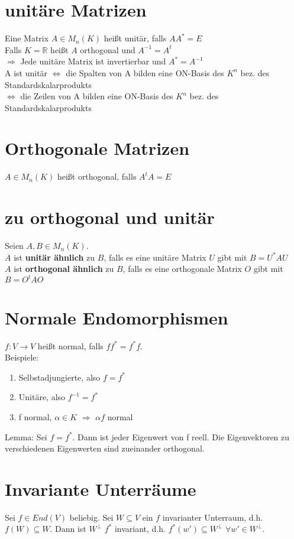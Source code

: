 \section{unitäre Matrizen}
Eine Matrix $A \in M_n(K)$ heißt unitär, falls $AA^* = E$\\
Falls $K = \mathbb{R}$ heißt $A$ orthogonal und $A^{-1} = A^t$\\
$\Rightarrow$ Jede unitäre Matrix ist invertierbar und $A^* = A^{-1}$\\
A ist unitär $\Leftrightarrow$ die Spalten von A bilden eine ON-Basis des $K^n$ bez. des Standardskalarprodukts\\
\hspace*{18mm} $\Leftrightarrow$ die Zeilen von A bilden eine ON-Basis des $K^n$ bez. des Standardskalarprodukts\\

\section{Orthogonale Matrizen}
$A \in M_n(K)$ heißt orthogonal, falls $A^tA = E$

\section{zu orthogonal und unitär}
Seien $A, B \in M_n(K)$.\\
$A$ ist \textbf{unitär ähnlich} zu $B$, falls es eine unitäre Matrix $U$ gibt mit $B = U^*AU$\\
$A$ ist \textbf{orthogonal ähnlich} zu $B$, falls es eine orthogonale Matrix $O$ gibt mit $B = O^tAO$

\section{Normale Endomorphismen}
$f: V \to V$ heißt normal, falls $ff^*=f^*f$.\\
Beispiele:
\begin{enumerate}
\item Selbstadjungierte, also $f = f^*$
\item Unitäre, also $f^{-1} = f^*$
\item f normal, $\alpha \in K$ $\Rightarrow$ $\alpha f$ normal
\end{enumerate}
Lemma: Sei $f = f^*$. Dann ist jeder Eigenwert von f reell. Die Eigenvektoren zu verschiedenen Eigenwerten sind zueinander orthogonal.

\section{Invariante Unterräume}
Sei $f \in End(V)$ beliebig. Sei $W \subseteq V$ ein $f$ invarianter Unterraum, d.h. $f(W) \subseteq W$. Dann ist $W^\perp$ $f^*$ invariant, d.h. $f^*(w') \subseteq W^\perp$ $\forall w' \in W^\perp$.

